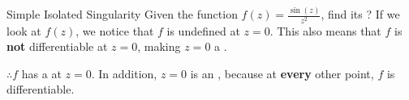 \begin{example}{Simple Isolated Singularity}
  Given the function $f(z) = \frac{\sin(z)}{z^{2}}$, find its ?
  \tcblower{}
  If we look at $f(z)$, we notice that $f$ is undefined at $z=0$.
  This also means that $f$ is \textbf{not} differentiable at $z=0$, making $z=0$ a .

  $\therefore f$ has a  at $z=0$.
  In addition, $z=0$ is an  , because at \textbf{every} other point, $f$ is differentiable.
\end{example}


